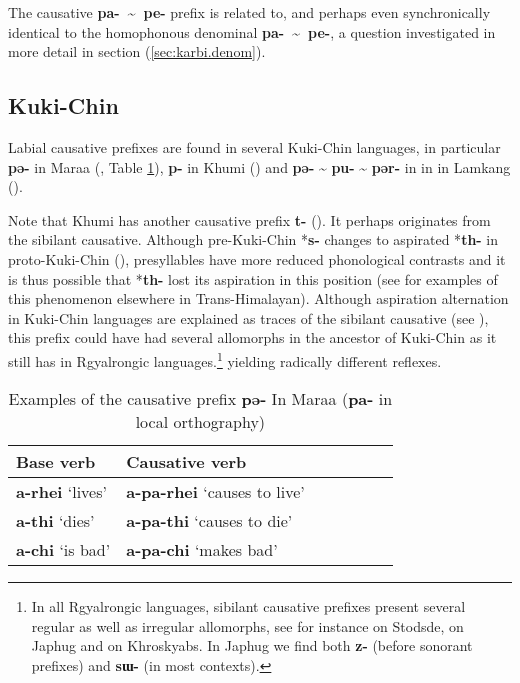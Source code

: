 \documentclass[oneside,a4paper,11pt]{article}
\newcommand{\ipa}[1]{\textbf{{\phon\mbox{#1}}}} %
\newcommand{\forme}[2]{\ipa{#1} `#2'}
\newcommand{\refb}[1]{(\ref{#1})}
\newcommand{\tld}{\textasciitilde{}}
\begin{document}
The causative \ipa{pa- \tld{} pe-} prefix is related to, and perhaps even synchronically identical to the homophonous denominal \ipa{pa- \tld{} pe-}, a question investigated in more detail in section \refb{sec:karbi.denom}.

\subsection{Kuki-Chin}  \label{sec:kc}
Labial causative prefixes are found in several Kuki-Chin languages, in particular \ipa{pə-} in Maraa (\citealt[139]{hartmann01prenasalization}, Table \ref{tab:maraa}), \ipa{p-} in Khumi (\citealt[99]{peterson10elaborate}) and \ipa{pə-} \tld{} \ipa{pu-} \tld{} \ipa{pər-} in in in Lamkang (\citealt[52-4]{chelliah07lamkang}).

Note that Khumi has another causative prefix \ipa{t-} (\citealt[12]{hartmann13valence}). It perhaps originates from the sibilant causative. Although pre-Kuki-Chin *\ipa{s-} changes to aspirated *\ipa{th-} in proto-Kuki-Chin (\citealt[16]{vanbik09pkc}), presyllables have more reduced phonological contrasts and it is thus possible that *\ipa{th-} lost its aspiration in this position (see \citealt{jacques12agreement} for examples of this phenomenon elsewhere in Trans-Himalayan). Although aspiration alternation in Kuki-Chin languages are explained as traces of the sibilant causative (see \citealt[220;259]{vanbik09pkc}), this prefix could have had several allomorphs in the ancestor of Kuki-Chin as it still has in Rgyalrongic languages.\footnote{In all Rgyalrongic languages, sibilant causative prefixes present several regular as well as irregular allomorphs, see for instance \citet{jackson07shangzhai} on Stodsde, \citet{jacques15causative} on Japhug and \citet{lai16caus} on Khroskyabs. In Japhug we find both \ipa{z-} (before sonorant prefixes) and \ipa{sɯ-} (in most contexts).} yielding radically different reflexes.


\begin{table}[H]
\caption{Examples of the causative prefix \ipa{pə-} In Maraa (\ipa{pa-} in local orthography)} \centering \label{tab:maraa}
\begin{tabular}{lllllll}
\toprule
Base verb & Causative verb \\
\midrule
\forme{a-rhei}{lives} & \forme{a-pa-rhei}{causes to live} \\
\forme{a-thi}{dies} & \forme{a-pa-thi}{causes to die} \\
\forme{a-chi}{is bad} & \forme{a-pa-chi}{makes bad} \\
\bottomrule
\end{tabular}
\end{table}
\end{document}
